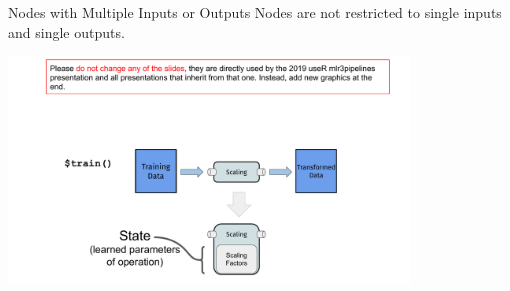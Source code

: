 \begin{frame}{Nodes with Multiple Inputs or Outputs}
	Nodes are not restricted to single inputs and single outputs.
	\begin{center}
		\includegraphics[page=6, width=0.8\textwidth, trim=130 0 100 160, clip]{images/mlr3Pipelines_graphics}
	\end{center}
\end{frame}


